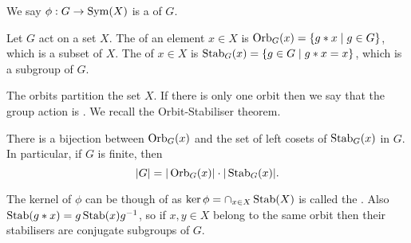 \documentclass[a4paper]{scrreprt}
\begin{document}
\begin{definition}
	We say $\phi: G \rightarrow \operatorname{Sym}(X)$ is a  of $G$.
\end{definition}

\begin{definition}
	Let $G$ act on a set $X$. The  of an element $x \in X$ is $\operatorname{Orb}_G(x) = \{ g * x \mid g \in G \}$, which is a subset of $X$. The  of $x \in X$ is $\operatorname{Stab}_G(x) = \{ g \in G \mid g * x = x \}$, which is a subgroup of $G$.
\end{definition}

The orbits partition the set $X$. If there is only one orbit then we say that the group action is .
We recall the Orbit-Stabiliser theorem.

\begin{theorem}
	There is a bijection between $\operatorname{Orb}_G(x)$ and the set of left cosets of $\operatorname{Stab}_G(x)$ in $G$. In particular, if $G$ is finite, then
	$$
	|G| = |\operatorname{Orb}_G(x)| \cdot |\operatorname{Stab}_G(x)|.
	$$
\end{theorem}

\begin{remark}
	The kernel of $\phi$ can be though of as $\operatorname{ker} \phi = \cap_{x \in X} \operatorname{Stab}(X)$ is called the .
	Also $\operatorname{Stab}(g * x) = g \operatorname{Stab}(x) g^{-1}$, so if $x, y \in X$ belong to the same orbit then their stabilisers are conjugate subgroups of $G$.
\end{remark}
\end{document}
